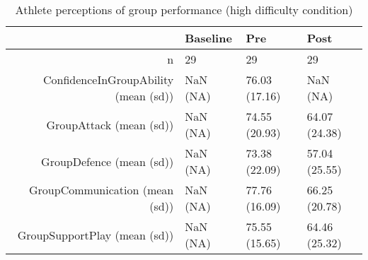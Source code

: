 \begin{table}[ht]
\centering
\begin{tabular}{rlll}
  \hline
 & Baseline & Pre & Post \\ 
  \hline
n &  29 &    29 &    29 \\ 
  ConfidenceInGroupAbility (mean (sd)) & NaN (NA) & 76.03 (17.16) &   NaN (NA) \\ 
  GroupAttack (mean (sd)) & NaN (NA) & 74.55 (20.93) & 64.07 (24.38) \\ 
  GroupDefence (mean (sd)) & NaN (NA) & 73.38 (22.09) & 57.04 (25.55) \\ 
  GroupCommunication (mean (sd)) & NaN (NA) & 77.76 (16.09) & 66.25 (20.78) \\ 
  GroupSupportPlay (mean (sd)) & NaN (NA) & 75.55 (15.65) & 64.46 (25.32) \\ 
   \hline
\end{tabular}
\caption{Athlete perceptions of 
 group performance (high difficulty condition)} 
\end{table}
